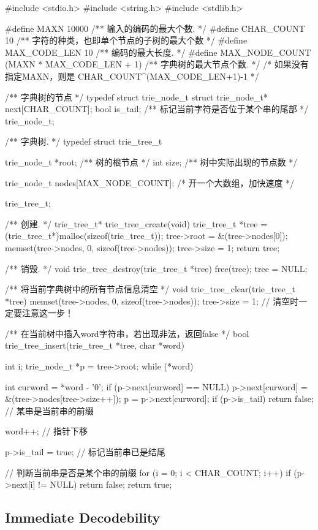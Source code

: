 \begin{Codex}[label=trie_tree.c]
#include <stdio.h>
#include <string.h>
#include <stdlib.h>


#define MAXN 10000   /** 输入的编码的最大个数. */
#define CHAR_COUNT  10 /** 字符的种类，也即单个节点的子树的最大个数 */
#define MAX_CODE_LEN 10 /** 编码的最大长度. */
#define MAX_NODE_COUNT  (MAXN * MAX_CODE_LEN + 1)  /** 字典树的最大节点个数. */
                   /* 如果没有指定MAXN，则是 CHAR_COUNT^(MAX_CODE_LEN+1)-1 */

/** 字典树的节点 */
typedef struct trie_node_t {
    struct trie_node_t* next[CHAR_COUNT];
    bool is_tail; /** 标记当前字符是否位于某个串的尾部 */
} trie_node_t;

/** 字典树. */
typedef struct trie_tree_t {
    trie_node_t *root; /** 树的根节点 */
    int size; /** 树中实际出现的节点数 */

    trie_node_t nodes[MAX_NODE_COUNT]; /* 开一个大数组，加快速度 */
} trie_tree_t;

/** 创建. */
trie_tree_t* trie_tree_create(void) {
    trie_tree_t *tree = (trie_tree_t*)malloc(sizeof(trie_tree_t));
    tree->root = &(tree->nodes[0]);
    memset(tree->nodes, 0, sizeof(tree->nodes));
    tree->size = 1;
    return tree;
}

/** 销毁. */
void trie_tree_destroy(trie_tree_t *tree) {
    free(tree);
    tree = NULL;
}

/** 将当前字典树中的所有节点信息清空 */
void trie_tree_clear(trie_tree_t *tree) {
    memset(tree->nodes, 0, sizeof(tree->nodes));
    tree->size = 1; // 清空时一定要注意这一步！
}

/** 在当前树中插入word字符串，若出现非法，返回false */
bool trie_tree_insert(trie_tree_t *tree, char *word) {
    int i;
    trie_node_t *p = tree->root;
    while (*word) {
        int curword = *word - '0';
        if (p->next[curword] == NULL) {
            p->next[curword] = &(tree->nodes[tree->size++]);
        }
        p = p->next[curword];
        if (p->is_tail) return false; // 某串是当前串的前缀

        word++; // 指针下移
    }

    p->is_tail = true; // 标记当前串已是结尾

    // 判断当前串是否是某个串的前缀
    for (i = 0; i < CHAR_COUNT; i++)
        if (p->next[i] != NULL)
            return false;
    return true;
}
\end{Codex}

\subsection{Immediate Decodebility}


